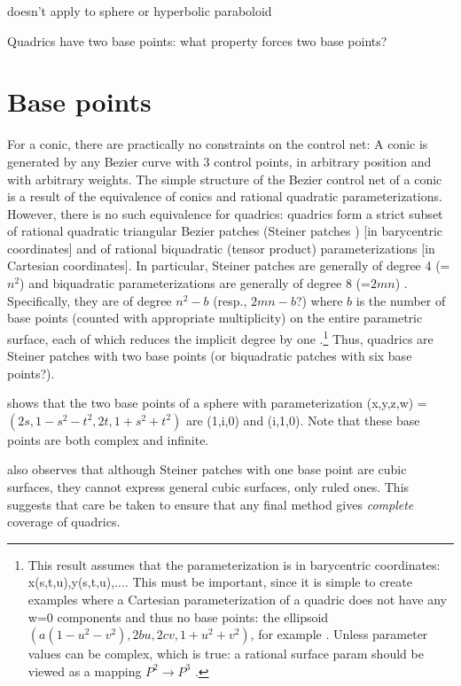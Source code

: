 	    doesn't apply to sphere or hyperbolic paraboloid

Quadrics have two base points: what property
forces two base points?

\section{Base points}

For a conic, there are practically no 
constraints on the control net:
A conic is generated by any Bezier curve with 
3 control points, in arbitrary position and with
arbitrary weights.
The simple structure of the Bezier 
control net of a conic is a result of 
the equivalence of conics and rational
quadratic parameterizations.
However, there is no such equivalence
for quadrics: quadrics form a strict
subset of rational quadratic triangular 
Bezier patches (Steiner patches \cite{Seder85}) [in
barycentric coordinates] and of
rational biquadratic (tensor product)
parameterizations [in Cartesian coordinates].
In particular, Steiner patches are generally
of degree 4 (=$n^2$) and biquadratic 
parameterizations are generally of degree 
8 (=$2mn$) \cite{Seder83}.  Specifically, they are of
degree $n^2 - b$ (resp., $2mn - b$?) where $b$	
is the number of base points (counted with	
appropriate multiplicity) on the entire parametric
surface, each of which reduces the implicit	
degree by one \cite{Warren90a}.\footnote{This result assumes
	that the parameterization is in barycentric
	coordinates: x(s,t,u),y(s,t,u),....
	This must be important, since it is simple to
	create examples where a Cartesian parameterization
	of a quadric does not have any w=0 components and thus
	no base points: the ellipsoid 
	$(a(1-u^2-v^2),2bu,2cv,1+u^2+v^2)$, for example		
	\cite[p. 217]{Gray93}.  Unless parameter values
	can be complex, which is true: a rational surface param should
	be viewed as a mapping $P^2 \rightarrow P^3$ 
	\cite[Section 3.2]{Manocha92}.}
Thus, quadrics are 
Steiner patches with two base points (or
biquadratic patches with six base points?).	

\cite{Seder90a} shows that the two base points of a sphere
with parameterization (x,y,z,w) = 
$(2s,1-s^2-t^2,2t,1+s^2+t^2)$ are (1,i,0) and
(i,1,0).  Note that these base points are both
complex and infinite.

\cite{Seder90a} also observes that although Steiner patches 
with one base point are cubic surfaces, they
cannot express general cubic surfaces, only ruled
ones.  This suggests that care be taken to ensure
that any final method gives {\em complete} coverage
of quadrics.

